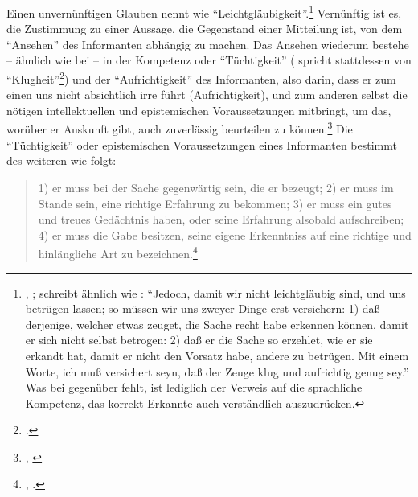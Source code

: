 Einen unvernünftigen Glauben nennt  wie 
\enquote{Leichtgläubigkeit}.\footnote{\cite[Vgl.][\S~213]{Meier:AuszugausderVernunftlehre1752},
\cite[][XVI: 508.26--27]{Kant:GesammelteWerke1900ff.};
\textcite[][201]{Wolff:VernuenftigeGedankenvondenKraeftendesmenschlichenVerstandesundihremrichtigenGebraucheinErkenntnisderWahrheit1978}
schreibt ähnlich wie : \enquote{Jedoch, damit wir nicht
leichtgläubig sind, und uns betrügen lassen; so müssen wir uns zweyer Dinge erst versichern: 1)
daß derjenige, welcher etwas zeuget, die Sache recht habe erkennen können,
damit er sich nicht selbst betrogen: 2) daß er die Sache so erzehlet, wie er
sie erkandt hat, damit er nicht den Vorsatz habe, andere zu betrügen. Mit
einem Worte, ich muß versichert seyn, daß der Zeuge klug und aufrichtig genug
sey.} Was bei  gegenüber  fehlt, ist lediglich der
Verweis auf die sprachliche Kompetenz, das korrekt Erkannte auch verständlich
auszudrücken.} Vernünftig ist es, die Zustimmung zu einer Aussage, die
Gegenstand einer Mitteilung ist, von dem \enquote{Ansehen} des Informanten
abhängig zu machen. Das Ansehen wiederum bestehe -- ähnlich wie bei
 -- in der Kompetenz oder
\enquote{Tüchtigkeit} ( spricht stattdessen von
\enquote{Klugheit}\footnote{\cite[Vgl.][201]{Wolff:VernuenftigeGedankenvondenKraeftendesmenschlichenVerstandesundihremrichtigenGebraucheinErkenntnisderWahrheit1978}.})
und der \enquote{Aufrichtigkeit} des Informanten, also darin, dass er zum
einen uns nicht absichtlich irre führt (Aufrichtigkeit), und zum anderen selbst
die nötigen intellektuellen und epistemischen Voraussetzungen mitbringt, um das,
worüber er Auskunft gibt, auch zuverlässig beurteilen zu
können.\footnote{\label{Fussnote:MeierzurBonitaetdesZeugen}\cite[Vgl.][\S~207]{Meier:AuszugausderVernunftlehre1752},
\cite[][XVI: 504.21--30]{Kant:GesammelteWerke1900ff.}} Die
\enquote{Tüchtigkeit} oder epistemischen Voraussetzungen eines Informanten
bestimmt  des weiteren wie folgt:
\begin{quote}
  1) er muss bei der Sache gegenwärtig sein, die er bezeugt; 2) er muss im Stande sein, eine richtige
Erfahrung zu bekommen; 3) er muss ein gutes und treues Gedächtnis haben, oder
seine Erfahrung alsobald aufschreiben; 4) er muss die Gabe besitzen, seine
eigene Erkenntniss auf eine richtige und hinlängliche Art zu
bezeichnen.\footnote{\cite[][\S~209]{Meier:AuszugausderVernunftlehre1752},
\cite[][XVI: 505.24--29]{Kant:GesammelteWerke1900ff.}.}
\end{quote}

